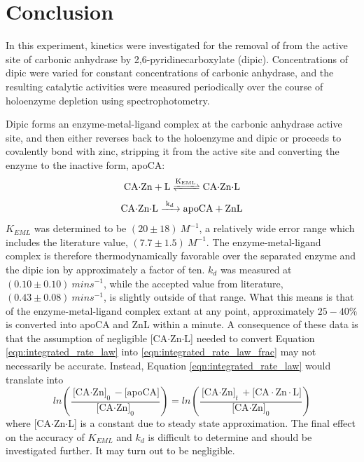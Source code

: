 \section{Conclusion}
In this experiment, kinetics were investigated for the removal of  from the active site of carbonic anhydrase by 2,6-pyridinecarboxylate (dipic). Concentrations of dipic were varied for constant concentrations of carbonic anhydrase, and the resulting catalytic activities were measured periodically over the course of holoenzyme depletion using spectrophotometry.

Dipic forms an enzyme-metal-ligand complex at the carbonic anhydrase active site, and then either reverses back to the holoenzyme and dipic or proceeds to covalently bond with zinc, stripping it from the active site and converting the enzyme to the inactive form, apoCA:
\begin{align*}
\ce{CA$\cdot$Zn + L
<=>[\ce{K_{EML}}]
CA$\cdot$Zn$\cdot$L}
\end{align*}
\begin{align*}\label{eqn:kd_reaction}
\ce{CA$\cdot$Zn$\cdot$L
->[\ce{k_{d}}]
apoCA + ZnL}
\end{align*}
$K_{EML}$ was determined to be $(20\pm{18}){\ }M^{-1}$, a relatively wide error range which includes the literature value, $(7.7\pm{1.5}){\ }M^{-1}$\cite{bib:easy_peasy_values}. The enzyme-metal-ligand complex is therefore thermodynamically favorable over the separated enzyme and the dipic ion by approximately a factor of ten. $k_{d}$ was measured at $(0.10\pm{0.10}){\ }mins^{-1}$, while the accepted value from literature, $(0.43\pm{0.08}){\ }mins^{-1}$, is slightly outside of that range. What this means is that of the enzyme-metal-ligand complex extant at any point, approximately $25-40\%$ is converted into apoCA and ZnL within a minute. A consequence of these data is that the assumption of negligible [CA$\cdot$Zn$\cdot$L] needed to convert Equation \eqref{eqn:integrated_rate_law} into \eqref{eqn:integrated_rate_law_frac} may not necessarily be accurate. Instead, Equation \eqref{eqn:integrated_rate_law} would translate into
\begin{equation}\label{eqn:integrated_rate_law}
ln \left( \frac{\text{[CA$\cdot$Zn]}_0 - \text{[apoCA]}}{\text{[CA$\cdot$Zn]}_0} \right)
=
ln \left( \frac{\text{[CA$\cdot$Zn]}_t + \text{[CA$\cdot$Zn$\cdot$L]}}{\text{[CA$\cdot$Zn]}_0} \right)
\end{equation}
where [CA$\cdot$Zn$\cdot$L] is a constant due to steady state approximation. The final effect on the accuracy of $K_{EML}$ and $k_{d}$ is difficult to determine and should be investigated further. It may turn out to be negligible.


